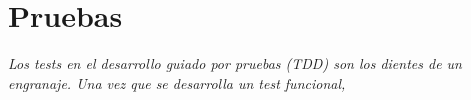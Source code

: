 \chapter{Pruebas}

\textit{Los tests en el desarrollo guiado por pruebas (TDD) son los dientes de un engranaje.
Una vez que se desarrolla un test funcional, }